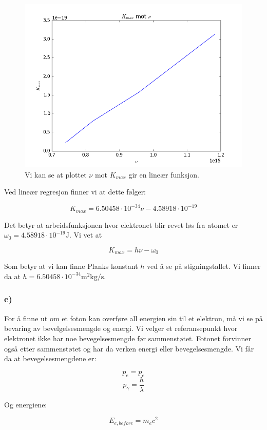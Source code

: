 \documentclass[a4paper,norsk, 10pt]{article}
\begin{document}
\begin{figure}[H]
\centering
\includegraphics[scale=0.3]{kmaxnu.png}
\caption{Vi kan se at plottet $\nu$ mot $K_{max}$ gir en lineær funksjon.}
\end{figure}

Ved lineær regresjon finner vi at dette følger:

$$
K_{max} = 6.50458\cdot 10^{-34} \nu - 4.58918\cdot 10^{-19}
$$

Det betyr at arbeidsfunksjonen hvor elektronet blir revet løs fra atomet er $\omega_0 = 4.58918\cdot 10^{-19} $J. Vi vet at

$$
K_{max} = h\nu - \omega_0
$$

Som betyr at vi kan finne Planks konstant $h$ ved å se på stigningstallet. Vi finner da at $h = 6.50458\cdot 10^{-34} \mathrm{m}^2 \mathrm{kg}/\mathrm{s}$.

\subsubsection*{e)}\label{subsec::overforingAvAllEnergi}
For å finne ut om et foton kan overføre all energien sin til et elektron, må vi se på bevaring av bevelgelsesmengde og energi. Vi velger et referansepunkt hvor elektronet ikke har noe bevegelsesmengde før sammenstøtet. Fotonet forvinner også etter sammenstøtet og har da verken energi eller bevegelsesmengde. Vi får da at bevegelsesmengdene er:

$$
p_e = p_e
$$
$$
p_{\gamma} = \frac{h}{\lambda}
$$

Og energiene:

$$
E_{e,before} = m_ec^2
$$
\end{document}
